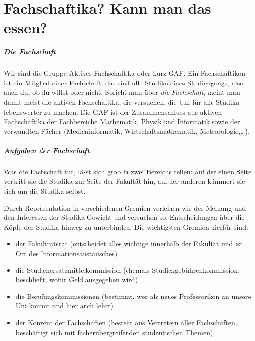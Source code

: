 \chapter{Fachschaftika? Kann man das essen?}

\paragraph{Die Fachschaft}

Wir sind die Gruppe Aktiver Fachschaftika oder kurz GAF. Ein Fachschaftikon ist ein Mitglied einer Fachschaft, das sind alle Studika eines Studiengangs, also auch du, ob du willst oder nicht. Spricht man über \emph{die Fachschaft}, meint man damit meist die aktiven Fachschaftika, die versuchen, die Uni für alle Studika lebenswerter zu machen. Die GAF ist der Zusammenschluss aus aktiven Fachschaftika der Fachbereiche Mathematik, Physik und Informatik sowie der verwandten Fächer (Medieninformatik, Wirtschaftsmathematik, Meteorologie,\ldots).

\paragraph{Aufgaben der Fachschaft}

Was die Fachschaft tut, lässt sich grob in zwei Bereiche teilen: auf der einen Seite vertritt sie die Studika zur Seite der Fakultät hin, auf der anderen kümmert sie sich um die Studika selbst.

Durch Repräsentation in verschiedenen Gremien verleihen wir der Meinung und den Interessen der Studika Gewicht und versuchen so, Entscheidungen über die Köpfe der Studika hinweg zu unterbinden. Die wichtigsten Gremien hierfür sind:
\begin{itemize}
\item der Fakulträtsrat (entscheidet alles wichtige innerhalb der Fakultät und ist Ort des Informationsaustausches)
\item die Studienersatzmittelkommission (ehemals Studiengebührenkommission; beschließt, wofür Geld ausgegeben wird)
\item die Berufungskommissionen (bestimmt, wer als neues Professorikon an unsere Uni kommt und hier auch lehrt)
\item der Konvent der Fachschaften (besteht aus Vertretern aller Fachschaften, beschäftigt sich mit fächerübergreifenden studentischen Themen)
\end{itemize}

